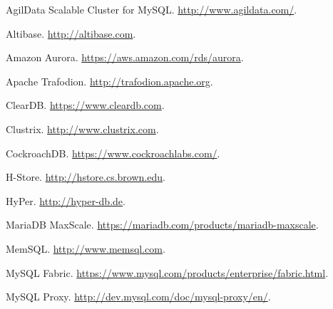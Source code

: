\documentclass[a4paper,12pt,notitlepage,twoside,openright]{article}
\begin{document}
\begin{enumerate}[label={[}\arabic*{]}]
\item AgilData Scalable Cluster for MySQL.
\url{http://www.agildata.com/}.

\item Altibase. \url{http://altibase.com}.

\item Amazon Aurora. \url{https://aws.amazon.com/rds/aurora}.
\item
  Apache Trafodion. \url{http://trafodion.apache.org}.
\item
  ClearDB. \url{https://www.cleardb.com}.
\item
  Clustrix. \url{http://www.clustrix.com}.
\item
  CockroachDB. \url{https://www.cockroachlabs.com/}.
\item
  H-Store. \url{http://hstore.cs.brown.edu}.
\item
  HyPer. \url{http://hyper-db.de}.
\item MariaDB MaxScale. \url{https://mariadb.com/products/mariadb-maxscale}.
\item MemSQL. \url{http://www.memsql.com}.

\item MySQL Fabric. \url{https://www.mysql.com/products/enterprise/fabric.html}.
\item MySQL Proxy.
\url{http://dev.mysql.com/doc/mysql-proxy/en/}.


\end{enumerate}
\end{document}
